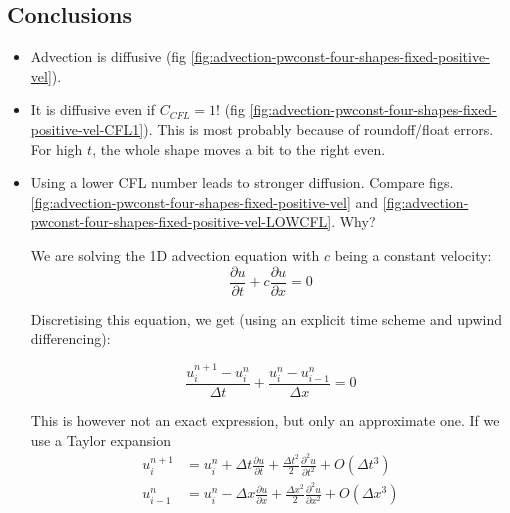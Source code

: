 \subsection{Conclusions} \label{chap:advection-conclusions}



\begin{itemize}


	\item Advection is diffusive (fig \ref{fig:advection-pwconst-four-shapes-fixed-positive-vel}).
	
	
	
	
	\item It is diffusive even if $C_{CFL} = 1$! (fig \ref{fig:advection-pwconst-four-shapes-fixed-positive-vel-CFL1}). 
            This is most probably because of roundoff/float errors. For high $t$, the whole shape moves a bit to the right even.
 
 
            
    \item Using a lower CFL number leads to stronger diffusion. 
    	Compare figs. \ref{fig:advection-pwconst-four-shapes-fixed-positive-vel} and \ref{fig:advection-pwconst-four-shapes-fixed-positive-vel-LOWCFL}. Why?
    
    	We are solving the 1D advection equation with $c$ being a constant velocity:
    	\begin{equation}
    		\frac{\partial u}{\partial t} + c\frac{\partial u}{\partial x} = 0 \label{eq:advection-1D}
    	\end{equation}
    
    	Discretising this equation, we get (using an explicit time scheme and upwind differencing):
    	
    	\begin{equation}
    		\frac{u_i^{n+1} - u_i^n}{\Delta t}+\frac{u_i^n-u_{i-1}^{n}}{\Delta x} = 0 \label{eq:advection-discretized}
    	\end{equation}
    	
    	This is however not an exact expression, but only an approximate one.
    	If we use a Taylor expansion
    	\begin{align}
    		u_i^{n+1} &= u_i^n + \Delta t \frac{\partial u}{\partial t}+\frac{\Delta t^2}{2}\frac{\partial^2 u }{\partial t^2}+O(\Delta t^3) \\
    		u_{i-1}^{n} &= u_{i}^n - \Delta x \frac{\partial u}{\partial x}+\frac{\Delta x^2}{2}\frac{\partial^2 u }{\partial x^2}+O(\Delta x^3)
    	\end{align}


\end{itemize}
